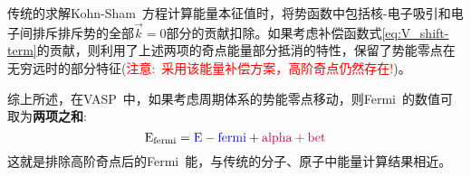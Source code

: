 \documentclass{article}      %
\begin{document}
传统的求解\textrm{Kohn-Sham~}方程计算能量本征值时，将势函数中包括核-电子吸引和电子间排斥排斥势的全部$\vec k=0$部分的贡献扣除。如果考虑补偿函数式\eqref{eq:V_shift-term}的贡献，则利用了上述两项的奇点能量部分抵消的特性，保留了势能零点在无穷远时的部分特征(\textcolor{red}{注意:~采用该能量补偿方案，高阶奇点仍然存在!})。

综上所述，在\textrm{VASP~}中，如果考虑周期体系的势能零点移动，则\textrm{Fermi~}的数值可取为\textbf{两项之和}:~
\begin{displaymath}
	\mathrm{E_{fermi}}=\textcolor{blue}{\mathrm{E-fermi}}+\textcolor{purple}{\mathrm{alpha+bet}}
\end{displaymath}
这就是排除高阶奇点后的\textrm{Fermi~}能，与传统的分子、原子中能量计算结果相近。
\end{document}
